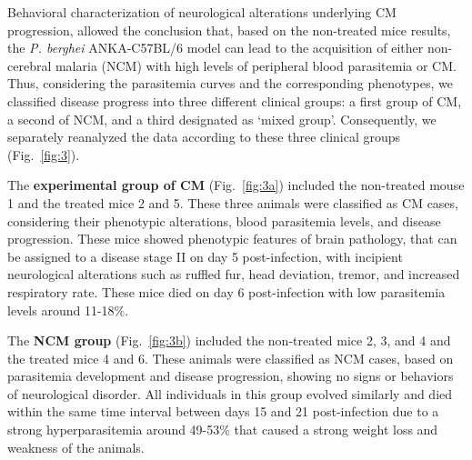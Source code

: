 \documentclass[empirical, authordate, issue]{jote-new-article}
\begin{document}
Behavioral characterization of neurological alterations underlying CM progression, allowed the conclusion that, based on the non-treated mice results, the \emph{P. berghei} ANKA-C57BL/6 model can lead to the acquisition of either non-cerebral malaria (NCM) with high levels of peripheral blood parasitemia or CM. Thus, considering the parasitemia curves and the corresponding phenotypes, we classified disease progress into three different clinical groups: a first group of CM, a second of NCM, and a third designated as `mixed group'. Consequently, we separately reanalyzed the data according to these three clinical groups (Fig.~\ref{fig:3}).

The \textbf{experimental group of CM }(Fig.~\ref{fig:3a}) included the non-treated mouse 1 and the treated mice 2 and 5. These three animals were classified as CM cases, considering their phenotypic alterations, blood parasitemia levels, and disease progression. These mice showed phenotypic features of brain pathology, that can be assigned to a disease stage II on day 5 post-infection, with incipient neurological alterations such as ruffled fur, head deviation, tremor, and increased respiratory rate. These mice died on day 6 post-infection with low parasitemia levels around 11-18\%.


The \textbf{NCM group} (Fig.~\ref{fig:3b}) included the non-treated mice 2, 3, and 4 and the treated mice 4 and 6. These animals were classified as NCM cases, based on parasitemia development and disease progression, showing no signs or behaviors of neurological disorder. All individuals in this group evolved similarly and died within the same time interval between days 15 and 21 post-infection due to a strong hyperparasitemia around 49-53\% that caused a strong weight loss and weakness of the animals.
\end{document}
